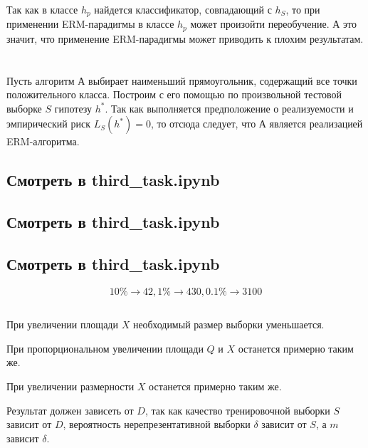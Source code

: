 \documentclass[a4paper]{article}
\begin{document}
Так как в классе $h_p$ найдется классификатор, совпадающий с $h_S$, то при применении ERM-парадигмы в классе $h_p$ может произойти переобучение. А это значит, что применение ERM-парадигмы может приводить к плохим результатам.

\section{}
\subsection{}

Пусть алгоритм А выбирает наименьший прямоугольник, содержащий все точки положительного класса. Построим с его помощью по произвольной тестовой выборке $S$ гипотезу $h^*$. Так как выполняется предположение о реализуемости и эмпирический риск $L_S(h^*) = 0$, то отсюда следует, что А является реализацией ERM-алгоритма.

\subsection{Смотреть в third\_task.ipynb}

\subsection{Смотреть в third\_task.ipynb}

\subsection{Смотреть в third\_task.ipynb}

$$
10\% \rightarrow 42, 1\% \rightarrow 430, 0.1\% \rightarrow 3100
$$
\subsection{}

При увеличении площади $X$ необходимый размер выборки уменьшается.

При пропорциональном увеличении площади $Q$ и $X$ останется примерно таким же.

При увеличении размерности $X$ останется примерно таким же.

Результат должен зависеть от $D$, так как качество тренировочной выборки $S$ зависит от $D$, вероятность нерепрезентативной выборки $\delta$ зависит от $S$, а $m$ зависит $\delta$.
\end{document}
